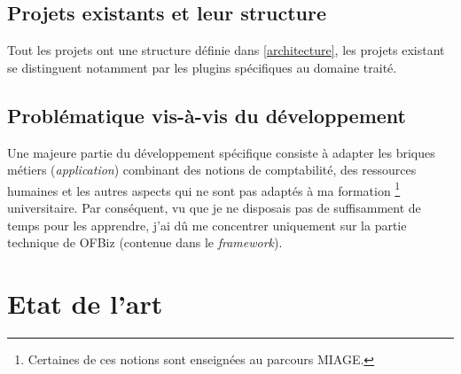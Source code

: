 \subsection{Projets existants et leur structure}
Tout les projets ont une structure définie dans \ref{architecture}, les projets existant se distinguent notamment par les plugins spécifiques au domaine traité. 

\subsection{Problématique vis-à-vis du développement}
\label{probfonctionnel}
Une majeure partie du développement spécifique consiste à adapter les briques métiers (\emph{application}) combinant des notions de comptabilité, des ressources humaines et les autres aspects qui ne sont pas adaptés à ma formation \footnote{Certaines de ces notions sont enseignées au parcours MIAGE.} universitaire. Par conséquent, vu que je ne disposais pas de suffisamment de temps pour les apprendre, j'ai dû me concentrer uniquement sur la partie technique de OFBiz (contenue dans le \emph{framework}).















\newpage


\section{Etat de l'art}

